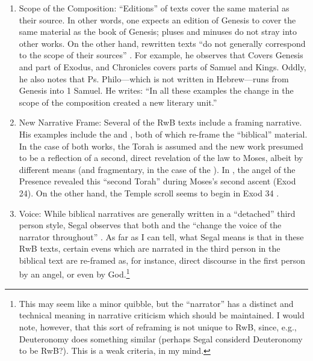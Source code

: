  \begin{enumerate} \def\labelenumi{\arabic{enumi}.} \item   Scope of the Composition: ``Editions'' of texts cover the same   material as their source. In other words, one expects an edition of   Genesis to cover the same material as the book of Genesis; pluses and   minuses do not stray into other works. On the other hand, rewritten   texts ``do not generally correspond to the scope of their sources''   \autocite[20]{segal_henze2005}. For example, he observes that   \jub Covers Genesis and part of Exodus, and Chronicles   covers parts of Samuel and Kings. Oddly, he also notes that Ps.   Philo---which is not written in Hebrew---runs from Genesis into 1   Samuel. He writes: ``In all these examples the change in the scope of   the composition created a new literary unit.''   \autocite[20--21]{segal_henze2005} \item   New Narrative Frame: Several of the RwB texts include a framing   narrative. His examples include the \templescroll and   \jub, both of which re-frame the ``biblical''   material. In the case of both works, the Torah is assumed and the new   work presumed to be a reflection of a second, direct revelation of the   law to Moses, albeit by different means (and fragmentary, in the case   of the \templescroll). In \jub, the   angel of the Presence revealed this ``second Torah'' during Moses's   second ascent (Exod 24). On the other hand, the Temple scroll seems to   begin in Exod 34 \autocite[22]{segal_henze2005}. \item   Voice: While biblical narratives are generally written in a   ``detached'' third person style, Segal observes that both   \jub and the \templescroll ``change   the voice of the narrator throughout'' \autocite[22]{segal_henze2005}.   As far as I can tell, what Segal means is that in these RwB texts,   certain evens which are narrated in the third person in the biblical   text are re-framed as, for instance, direct discourse in the first   person by an angel, or even by God.\footnote{This may seem like a     minor quibble, but the ``narrator'' has a distinct and technical     meaning in narrative criticism which should be maintained. I would     note, however, that this sort of reframing is not unique to RwB,     since, e.g., Deuteronomy does something similar (perhaps Segal     considerd Deuteronomy to be RwB?). This is a weak criteria, in my     mind.} \end{enumerate} 

